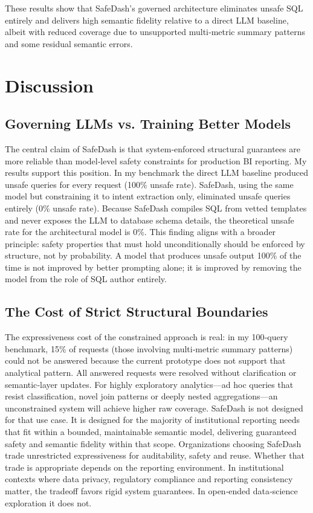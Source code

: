 \documentclass[11pt]{article}
\begin{document}
These results show that SafeDash’s governed architecture eliminates unsafe SQL entirely and delivers high semantic fidelity relative to a direct LLM baseline, albeit with reduced coverage due to unsupported multi‑metric summary patterns and some residual semantic errors.

\section{Discussion}
\subsection{Governing LLMs vs. Training Better Models}
The central claim of SafeDash is that system-enforced structural guarantees are more reliable than model‑level safety constraints for production BI reporting. My results support this position. In my benchmark the direct LLM baseline produced unsafe queries for every request (100\% unsafe rate). SafeDash, using the same model but constraining it to intent extraction only, eliminated unsafe queries entirely (0\% unsafe rate). Because SafeDash compiles SQL from vetted templates and never exposes the LLM to database schema details, the theoretical unsafe rate for the architectural model is 0\%. This finding aligns with a broader principle: safety properties that must hold unconditionally should be enforced by structure, not by probability. A model that produces unsafe output 100\% of the time is not improved by better prompting alone; it is improved by removing the model from the role of SQL author entirely.

\subsection{The Cost of Strict Structural Boundaries}
The expressiveness cost of the constrained approach is real: in my 100‑query benchmark, 15\% of requests (those involving multi‑metric summary patterns) could not be answered because the current prototype does not support that analytical pattern. All answered requests were resolved without clarification or semantic‑layer updates. For highly exploratory analytics—ad hoc queries that resist classification, novel join patterns or deeply nested aggregations—an unconstrained system will achieve higher raw coverage. SafeDash is not designed for that use case. It is designed for the majority of institutional reporting needs that fit within a bounded, maintainable semantic model, delivering guaranteed safety and semantic fidelity within that scope. Organizations choosing SafeDash trade unrestricted expressiveness for auditability, safety and reuse. Whether that trade is appropriate depends on the reporting environment. In institutional contexts where data privacy, regulatory compliance and reporting consistency matter, the tradeoff favors rigid system guarantees. In open‑ended data‑science exploration it does not.
\end{document}
